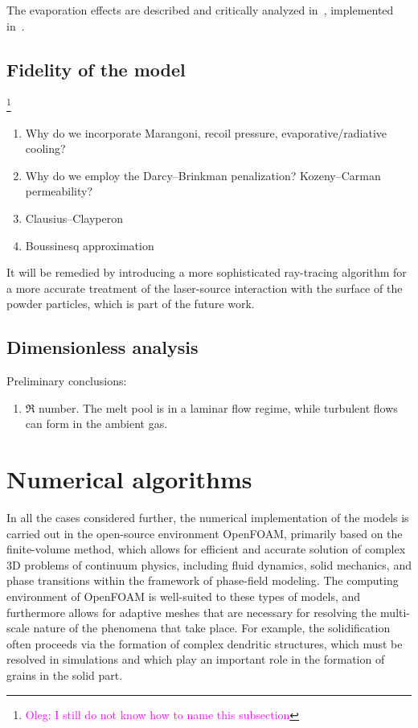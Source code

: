 \documentclass{article}
\newcommand{\OpenFOAM}{OpenFOAM\textregistered\xspace}
\newcommand{\oleg}[1]{\textcolor{magenta}{\footnote{\textcolor{magenta}{Oleg: #1}}}} %
\begin{document}
The evaporation effects are described and critically analyzed in~\cite{cook2019simulation}, implemented in~\cite{khairallah2016laser}.

\subsection{Fidelity of the model}\oleg{I still do not know how to name this subsection}

\begin{enumerate}
    \item Why do we incorporate Marangoni, recoil pressure, evaporative/radiative cooling?
    \item Why do we employ the Darcy--Brinkman penalization?\cite{voller1987fixed, le2006interfacial} Kozeny--Carman permeability?
    \item Clausius--Clayperon~\cite{klassen2014evaporation, cook2019simulation}
    \item Boussinesq approximation
\end{enumerate}

It will be remedied by introducing a more sophisticated ray-tracing algorithm
for a more accurate treatment of the laser-source interaction with the surface of the powder particles,
which is part of the future work.

\subsection{Dimensionless analysis}

Preliminary conclusions:
\begin{enumerate}
    \item $\Re$ number. The melt pool is in a laminar flow regime, while  turbulent flows can form in the ambient gas.
\end{enumerate}

\section{Numerical algorithms}

In all the cases considered further, the numerical implementation of the models is carried out
in the open-source environment \OpenFOAM, primarily based on the finite-volume method,
which allows for efficient and accurate solution of complex 3D problems of continuum physics,
including fluid dynamics, solid mechanics, and phase transitions within the framework of phase-field modeling.
The computing environment of \OpenFOAM is well-suited to these types of models,
and furthermore allows for adaptive meshes that are necessary
for resolving the multi-scale nature of the phenomena that take place.
For example, the solidification often proceeds via the formation of complex dendritic structures,
which must be resolved in simulations and which play an important role in the formation of grains in the solid part.
\end{document}
